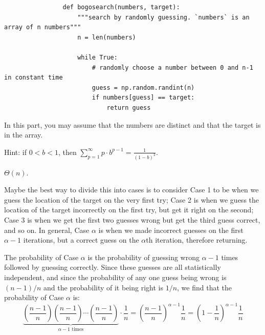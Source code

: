 \begin{prob}
\begin{subprobset}
        \begin{subprob}
            \begin{verbatim}
                def bogosearch(numbers, target):
                    """search by randomly guessing. `numbers` is an array of n numbers"""
                    n = len(numbers)

                    while True:
                        # randomly choose a number between 0 and n-1 in constant time
                        guess = np.random.randint(n)
                        if numbers[guess] == target:
                            return guess
            \end{verbatim}

            In this part, you may assume that the numbers are distinct and that the
            target is in the array.

            Hint: if $0 < b < 1$, then $\sum_{p = 1}^\infty p \cdot b^{p-1} = \frac{1}{(1 - b)^2}$.

            \begin{soln}
                $\Theta(n)$.

                Maybe the best way to divide this into cases is to consider Case 1 to
                be when we guess the location of the target on the very first try;
                Case 2 is when we guess the location of the target incorrectly on the
                first try, but get it right on the second; Case 3 is when we get the
                first two guesses wrong but get the third guess correct, and so on.
                In general, Case $\alpha$ is when we made incorrect guesses on the first
                $\alpha - 1$ iterations, but a correct guess on the $\alpha$th iteration,
                therefore returning.

                The probability of Case $\alpha$ is the probability of guessing wrong $\alpha - 1$
                times followed by guessing correctly. Since these guesses are all statistically
                independent, and since the probability of any one guess being wrong is
                $(n - 1)/n$ and the probability of it being right is $1/n$, we find that
                the probability of Case $\alpha$ is:
                \[
                    \underbrace{
                        \left( \frac{n-1}{n} \right)
                        \left( \frac{n-1}{n} \right)
                        \cdots
                        \left( \frac{n-1}{n} \right)
                    }_{\alpha - 1 \text{ times}}
                    \cdot \frac{1}{n}
                    =
                    \left(
                        \frac{n-1}{n}
                    \right)^{\alpha-1} \frac{1}{n}
                    =
                    \left(
                        1 - \frac{1}{n}
                    \right)^{\alpha-1} \frac{1}{n}
                \]


\end{soln}
\end{subprob}
\end{subprobset}
\end{prob}
